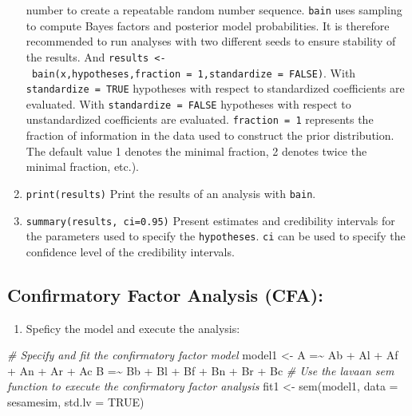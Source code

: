 \documentclass[
]{book}
\newenvironment{Shaded}{\begin{snugshade}}{\end{snugshade}}
\newcommand{\AttributeTok}[1]{\textcolor[rgb]{0.77,0.63,0.00}{#1}}
\newcommand{\CommentTok}[1]{\textcolor[rgb]{0.56,0.35,0.01}{\textit{#1}}}
\newcommand{\ConstantTok}[1]{\textcolor[rgb]{0.00,0.00,0.00}{#1}}
\newcommand{\FunctionTok}[1]{\textcolor[rgb]{0.00,0.00,0.00}{#1}}
\newcommand{\NormalTok}[1]{#1}
\newcommand{\OtherTok}[1]{\textcolor[rgb]{0.56,0.35,0.01}{#1}}
\newcommand{\StringTok}[1]{\textcolor[rgb]{0.31,0.60,0.02}{#1}}
\providecommand{\tightlist}{%
  \setlength{\itemsep}{0pt}\setlength{\parskip}{0pt}}
\begin{document}
\begin{enumerate}
  number to create a repeatable random number sequence. \texttt{bain} uses sampling to compute Bayes factors and posterior model probabilities. It is therefore recommended to run analyses with two different seeds to ensure stability of the results.
  And \texttt{results\ \textless{}-\ bain(x,hypotheses,fraction\ =\ 1,standardize\ =\ FALSE)}.
  With \texttt{standardize\ =\ TRUE} hypotheses with respect
  to standardized coefficients are evaluated. With \texttt{standardize\ =\ FALSE} hypotheses with respect to unstandardized coefficients
  are evaluated. \texttt{fraction\ =\ 1} represents the fraction of information in the data used to construct the prior distribution. The default value 1 denotes the minimal fraction, 2 denotes twice the minimal fraction, etc.).
\item
  \texttt{print(results)} Print the results of an analysis with
  \texttt{bain}.
\item
  \texttt{summary(results,\ ci=0.95)} Present estimates and credibility intervals for the parameters used to specify the \texttt{hypotheses}. \texttt{ci} can be used to specify the confidence level of the credibility intervals.
\end{enumerate}

\hypertarget{confirmatory-factor-analysis-cfa}{%
\subsection{Confirmatory Factor Analysis (CFA):}\label{confirmatory-factor-analysis-cfa}}

\begin{enumerate}
\def\labelenumi{\arabic{enumi})}
\tightlist
\item
  Speficy the model and execute the analysis:
\end{enumerate}

\begin{Shaded}
\begin{Highlighting}[]
\CommentTok{\#  Specify and fit the confirmatory factor model}
\NormalTok{model1 }\OtherTok{\textless{}{-}} \StringTok{\textquotesingle{}}
\StringTok{    A =\textasciitilde{} Ab + Al + Af + An + Ar + Ac }
\StringTok{    B =\textasciitilde{} Bb + Bl + Bf + Bn + Br + Bc }
\StringTok{\textquotesingle{}}
\CommentTok{\# Use the lavaan sem function to execute the confirmatory factor analysis}
\NormalTok{fit1 }\OtherTok{\textless{}{-}} \FunctionTok{sem}\NormalTok{(model1, }\AttributeTok{data =}\NormalTok{ sesamesim, }\AttributeTok{std.lv =} \ConstantTok{TRUE}\NormalTok{)}
\end{Highlighting}
\end{Shaded}
\end{document}
